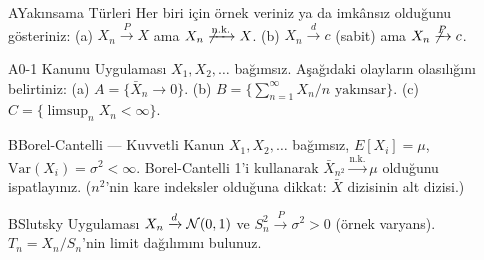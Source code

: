 

\begin{alistirma}[Al.7.5]{A}{Yakınsama Türleri}
Her biri için örnek veriniz ya da imkânsız olduğunu gösteriniz:
(a) $X_n \xrightarrow{P} X$ ama $X_n \not\xrightarrow{\text{n.k.}} X$.
(b) $X_n \xrightarrow{d} c$ (sabit) ama $X_n \not\xrightarrow{P} c$.
\end{alistirma}
\alistirmalar


\begin{alistirma}[Al.7.6]{A}{0-1 Kanunu Uygulaması}
$X_1, X_2, \ldots$ bağımsız. Aşağıdaki olayların olasılığını belirtiniz:
(a) $A = \{\bar{X}_n \to 0\}$.
(b) $B = \{\sum_{n=1}^\infty X_n/n \text{ yakınsar}\}$.
(c) $C = \{\limsup_n X_n < \infty\}$.
\end{alistirma}

\begin{alistirma}[Al.7.7]{B}{Borel-Cantelli --- Kuvvetli Kanun}
$X_1, X_2, \ldots$ bağımsız, $E[X_i] = \mu$, $\mathrm{Var}(X_i) = \sigma^2 < \infty$.
Borel-Cantelli 1'i kullanarak $\bar{X}_{n^2} \xrightarrow{\text{n.k.}} \mu$ olduğunu ispatlayınız.
($n^2$'nin kare indeksler olduğuna dikkat: $\bar{X}$ dizisinin alt dizisi.)
\end{alistirma}

\begin{alistirma}[Al.7.8]{B}{Slutsky Uygulaması}
$X_n \xrightarrow{d} \mathcal{N}(0,1)$ ve $S_n^2 \xrightarrow{P} \sigma^2 > 0$ (örnek varyans).
$T_n = X_n / S_n$'nin limit dağılımını bulunuz.
\end{alistirma}

